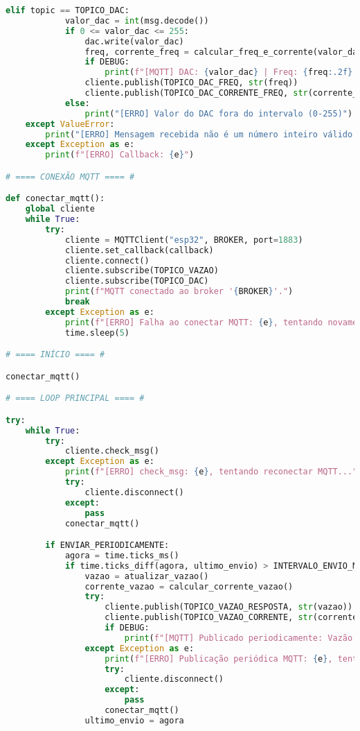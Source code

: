 \documentclass[a4paper,12pt]{article}
\begin{document}
\begin{lstlisting}[language=Python, caption={Código Principal do ESP32}, label={lst:codigoESP32}]
        elif topic == TOPICO_DAC:
            valor_dac = int(msg.decode())
            if 0 <= valor_dac <= 255:
                dac.write(valor_dac)
                freq, corrente_freq = calcular_freq_e_corrente(valor_dac)
                if DEBUG:
                    print(f"[MQTT] DAC: {valor_dac} | Freq: {freq:.2f} Hz | Corrente: {corrente_freq:.2f} mA")
                cliente.publish(TOPICO_DAC_FREQ, str(freq))
                cliente.publish(TOPICO_DAC_CORRENTE_FREQ, str(corrente_freq))
            else:
                print("[ERRO] Valor do DAC fora do intervalo (0-255)")
    except ValueError:
        print("[ERRO] Mensagem recebida não é um número inteiro válido.")
    except Exception as e:
        print(f"[ERRO] Callback: {e}")

# ==== CONEXÃO MQTT ==== #

def conectar_mqtt():
    global cliente
    while True:
        try:
            cliente = MQTTClient("esp32", BROKER, port=1883)
            cliente.set_callback(callback)
            cliente.connect()
            cliente.subscribe(TOPICO_VAZAO)
            cliente.subscribe(TOPICO_DAC)
            print(f"MQTT conectado ao broker '{BROKER}'.")
            break
        except Exception as e:
            print(f"[ERRO] Falha ao conectar MQTT: {e}, tentando novamente em 5s...")
            time.sleep(5)

# ==== INÍCIO ==== #

conectar_mqtt()

# ==== LOOP PRINCIPAL ==== #

try:
    while True:
        try:
            cliente.check_msg()
        except Exception as e:
            print(f"[ERRO] check_msg: {e}, tentando reconectar MQTT...")
            try:
                cliente.disconnect()
            except:
                pass
            conectar_mqtt()

        if ENVIAR_PERIODICAMENTE:
            agora = time.ticks_ms()
            if time.ticks_diff(agora, ultimo_envio) > INTERVALO_ENVIO_MS:
                vazao = atualizar_vazao()
                corrente_vazao = calcular_corrente_vazao()
                try:
                    cliente.publish(TOPICO_VAZAO_RESPOSTA, str(vazao))
                    cliente.publish(TOPICO_VAZAO_CORRENTE, str(corrente_vazao))
                    if DEBUG:
                        print(f"[MQTT] Publicado periodicamente: Vazão {vazao:.2f}, Corrente {corrente_vazao:.2f}")
                except Exception as e:
                    print(f"[ERRO] Publicação periódica MQTT: {e}, tentando reconectar...")
                    try:
                        cliente.disconnect()
                    except:
                        pass
                    conectar_mqtt()
                ultimo_envio = agora


\end{lstlisting}
\end{document}
